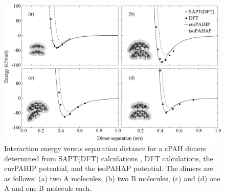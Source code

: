%
\begin{figure}[!tbh]
\centering
\includegraphics[width=1\linewidth]{Figures/potentialDFT_curves.eps}
\caption{Interaction energy versus separation distance for a cPAH dimers determined from SAPT(DFT) calculations \cite{Cabaleiro-Lago2018}, DFT calculations, the curPAHIP potential, and the isoPAHAP potential. The dimers are as follows: (a) two A molecules, (b) two B molecules, (c) and (d) one A and one B molecule each.}
\label{fig:potentialDFTcurves}
\end{figure}
%
%
